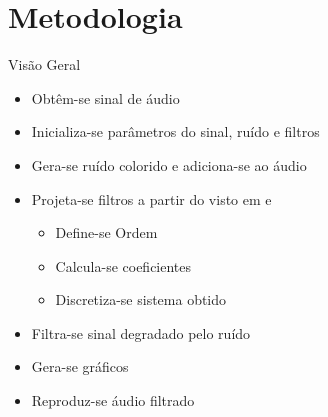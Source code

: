 \section{Metodologia}


\begin{frame}{Visão Geral}
    \begin{itemize}
        \item Obtêm-se sinal de áudio
        \item Inicializa-se parâmetros do sinal, ruído e filtros
        \item Gera-se ruído colorido e adiciona-se ao áudio
        \item Projeta-se filtros a partir do visto em \cite{oppenheim2013discrete} e \cite{chaparro2010signals}
        \begin{itemize}
            \item Define-se Ordem
            \item Calcula-se coeficientes
            \item Discretiza-se sistema obtido
        \end{itemize}
        \item Filtra-se sinal degradado pelo ruído
        \item Gera-se gráficos
        \item Reproduz-se áudio filtrado

    \end{itemize}
\end{frame}

